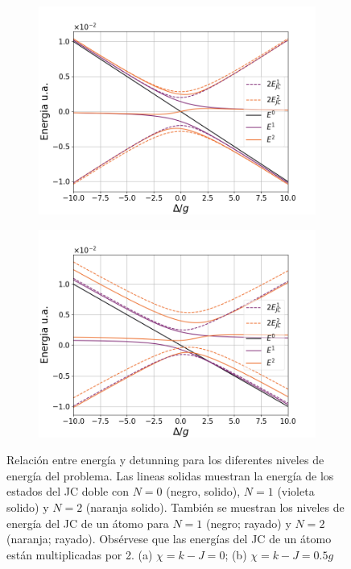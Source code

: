 \begin{figure}
    \centering
    \begin{subfigure}[h]{0.49\textwidth}
        \centering
        \includegraphics[width=\textwidth]{figuras/ch4/energias 0.png}
        \caption{}
        \label{fig:relación energia detunning 1}
    \end{subfigure}
    \hfill
    \begin{subfigure}[h]{0.49\textwidth}
        \centering
        \includegraphics[width=\textwidth]{figuras/ch4/energias 0.5.png}
        \caption{}
        \label{fig:relación energia detunning 2}
    \end{subfigure}
       \caption{Relación entre energía y detunning para los diferentes niveles de energía del problema. Las lineas solidas muestran la energía de los estados del JC doble con $N=0$ (negro, solido), $N=1$ (violeta solido) y $N=2$ (naranja solido). También se muestran los niveles de energía del JC de un átomo para $N=1$ (negro; rayado) y $N=2$ (naranja; rayado). Obsérvese que las energías del JC de un átomo están multiplicadas por 2. (a) $\chi=k-J=0$; (b) $\chi=k-J=0.5g$}
       \label{fig:relación energia detunning}
\end{figure}
